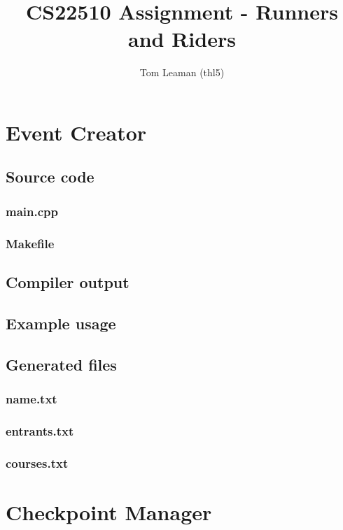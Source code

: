 \documentclass[a4paper, twoside]{article}
\title{CS22510 Assignment - Runners and Riders}
\author{Tom Leaman (thl5)}
\begin{document}
\maketitle
\newpage
\tableofcontents
\newpage

\section{Event Creator}
\subsection{Source code}
\subsubsection{main.cpp}

\subsubsection{Makefile}

\subsection{Compiler output}

\subsection{Example usage}

\subsection{Generated files}
\subsubsection{name.txt}

\subsubsection{entrants.txt}

\subsubsection{courses.txt}


\section{Checkpoint Manager}
\end{document}
